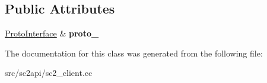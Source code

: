 \subsection*{Public Attributes}
\begin{DoxyCompactItemize}
\item 
\mbox{\label{classsc2_1_1_unit_query_imp_a998dc8c0efce2468464faf9d8551e1ac}} 
\hyperlink{classsc2_1_1_proto_interface}{Proto\+Interface} \& {\bfseries proto\+\_\+}
\end{DoxyCompactItemize}


The documentation for this class was generated from the following file\+:\begin{DoxyCompactItemize}
\item 
src/sc2api/sc2\+\_\+client.\+cc\end{DoxyCompactItemize}
